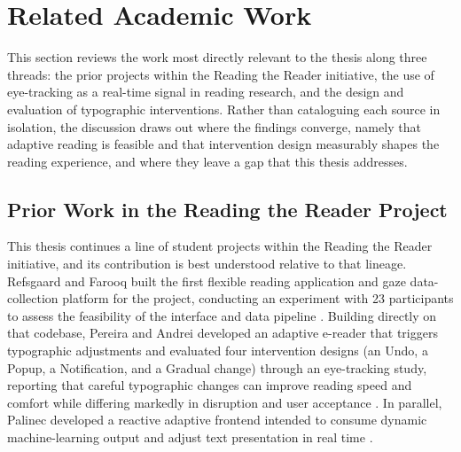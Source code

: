 \section{Related Academic Work}
\label{sec:related-work}
This section reviews the work most directly relevant to the thesis along three threads: the prior projects within the Reading the Reader initiative, the use of eye-tracking as a real-time signal in reading research, and the design and evaluation of typographic interventions.
Rather than cataloguing each source in isolation, the discussion draws out where the findings converge, namely that adaptive reading is feasible and that intervention design measurably shapes the reading experience, and where they leave a gap that this thesis addresses.

\subsection{Prior Work in the Reading the Reader Project}
\label{subsec:related-rtr-prior-work}
This thesis continues a line of student projects within the Reading the Reader initiative, and its contribution is best understood relative to that lineage.
Refsgaard and Farooq built the first flexible reading application and gaze data-collection platform for the project, conducting an experiment with 23 participants to assess the feasibility of the interface and data pipeline \cite{refsgaard2024rtr}.
Building directly on that codebase, Pereira and Andrei developed an adaptive e-reader that triggers typographic adjustments and evaluated four intervention designs (an Undo, a Popup, a Notification, and a Gradual change) through an eye-tracking study, reporting that careful typographic changes can improve reading speed and comfort while differing markedly in disruption and user acceptance \cite{pereira2024typography}.
In parallel, Palinec developed a reactive adaptive frontend intended to consume dynamic machine-learning output and adjust text presentation in real time \cite{palinec2024reactive}.


